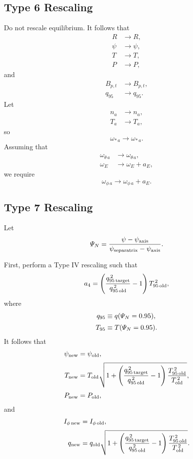 \documentclass[12pt]{article}
\begin{document}
\subsection{Type 6 Rescaling}
Do not rescale equilibrium. It follows that
\begin{align}
R&\rightarrow R,\\[0.5ex]
\psi&\rightarrow\psi,\\[0.5ex]
T&\rightarrow T,\\[0.5ex]
P&\rightarrow P,
\end{align}
and 
\begin{align}
B_{p,t}&\rightarrow B_{p,t},\\[0.5ex]
q_{95}&\rightarrow q_{95}.
\end{align}
Let
\begin{align}
n_a&\rightarrow n_a,\\[0.5ex]
T_a&\rightarrow T_a,
\end{align}
so
\begin{equation}
\omega_{\ast\,a} \rightarrow \omega_{\ast\,a}.
\end{equation}
Assuming that
\begin{align}
\omega_{\theta\,a}&\rightarrow \omega_{\theta\,a},\\[0.5ex]
\omega_E &\rightarrow \omega_E +a_E,
\end{align}
we require 
\begin{equation}
\omega_{\phi\,a}\rightarrow \omega_{\phi\,a} + a_E.
\end{equation}

\subsection{Type 7 Rescaling}
Let
\begin{equation}
{\mit\Psi}_N = \frac{\psi - \psi_{\rm axis}}{\psi_{\rm separatrix}-\psi_{\rm axis}}.
\end{equation}

First, perform a Type IV rescaling such that 
\begin{equation}
a_4= \left(\frac{q_{95\,{\rm target}}^{\,2}}{q_{95\,{\rm old}}^{\,2}}-1\right)T_{95\,{\rm old}}^{\,2},
\end{equation}
where
\begin{align}
q_{95} &\equiv q({\mit\Psi}_N=0.95),\\[0.5ex]
T_{95}&\equiv T({\mit\Psi}_N=0.95).
\end{align}
It follows that
\begin{align}
\psi_{\rm new} &= \psi_{\rm old},\\[0.5ex]
T_{\rm new} & =T_{\rm old}\sqrt{1 +\left(\frac{q_{95\,{\rm target}}^{\,2}}{q_{95\,{\rm old}}^{\,2}}-1\right)\frac{T_{95\,{\rm old}}^{\,2}}{T_{\rm old}^{\,2}}},\\[0.5ex]
P_{\rm new} &= P_{\rm old},
\end{align}
and
\begin{align}
I_{\phi\,{\rm new}} &=I_{\phi\,{\rm old}},\\[0.5ex]
q_{\rm new} &= q_{\rm old}\sqrt{1 +\left(\frac{q_{95\,{\rm target}}^{\,2}}{q_{95\,{\rm old}}^{\,2}}-1\right)\frac{T_{95\,{\rm old}}^{\,2}}{T_{\rm old}^{\,2}}}.
\end{align} 
\end{document}
